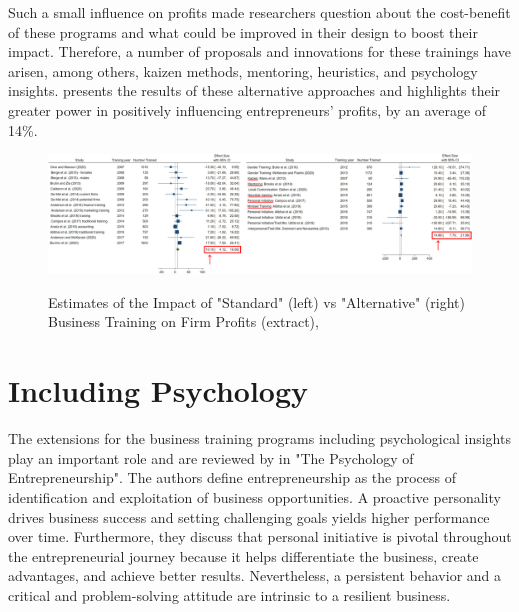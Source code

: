 Such a small influence on profits made researchers question about the cost-benefit of these programs and what could be improved in their design to boost their impact. Therefore, a number of proposals and innovations for these trainings have arisen, among others, kaizen methods, mentoring, heuristics, and psychology insights. \cite{McKenzie2020} presents the results of these alternative approaches and highlights their greater power in positively influencing entrepreneurs' profits, by an average of 14\%.
\begin{figure}[t]
    \centering
    \caption{Estimates of the Impact of "Standard" (left) vs "Alternative" (right) Business Training on Firm Profits (extract), \cite{McKenzie2020}}
    \includegraphics[width=\textwidth]{img/meta-analysis.jpg}
    \label{meta-analysis}
\end{figure}

\section{Including Psychology}

The extensions for the business training programs including psychological insights play an important role and are reviewed by \cite{Frese2014} in "The Psychology of Entrepreneurship". The authors define entrepreneurship as the process of identification and exploitation of business opportunities. A proactive personality drives business success and setting challenging goals yields higher performance over time. Furthermore, they discuss that personal initiative is pivotal throughout the entrepreneurial journey because it helps differentiate the business, create advantages, and achieve better results. Nevertheless, a persistent behavior and a critical and problem-solving attitude are intrinsic to a resilient business.  

